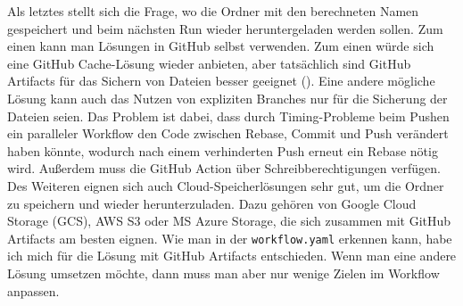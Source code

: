 Als letztes stellt sich die Frage, wo die Ordner mit den berechneten Namen gespeichert und beim nächsten Run wieder heruntergeladen werden sollen.
Zum einen kann man Lösungen in GitHub selbst verwenden.
Zum einen würde sich eine GitHub Cache-Lösung wieder anbieten, aber tatsächlich sind GitHub Artifacts für das Sichern von Dateien besser geeignet (\cite{github_cache_doku}).
Eine andere mögliche Lösung kann auch das Nutzen von expliziten Branches nur für die Sicherung der Dateien seien.
Das Problem ist dabei, dass durch Timing-Probleme beim Pushen ein paralleler Workflow den Code zwischen Rebase, Commit und Push verändert haben könnte, wodurch nach einem verhinderten Push erneut ein Rebase nötig wird.
Außerdem muss die GitHub Action über Schreibberechtigungen verfügen.
Des Weiteren eignen sich auch Cloud-Speicherlösungen sehr gut, um die Ordner zu speichern und wieder herunterzuladen.
Dazu gehören von Google Cloud Storage (GCS), AWS S3 oder MS Azure Storage, die sich zusammen mit GitHub Artifacts am besten eignen.
Wie man in der \texttt{workflow.yaml} erkennen kann, habe ich mich für die Lösung mit GitHub Artifacts entschieden.
Wenn man eine andere Lösung umsetzen möchte, dann muss man aber nur wenige Zielen im Workflow anpassen.